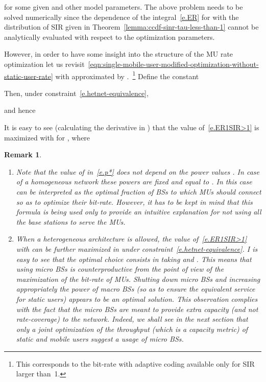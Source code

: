 \documentclass[10pt,journal]{IEEEtran}
\newtheorem{remark}{Remark}
\begin{document}
for some given   and other model parameters.
The above problem needs to be solved numerically since the 
dependence of the integral~\eqref{e.ER} for  with the 
distribution of SIR given in Theorem~\ref{lemma:ccdf-sinr-tau-less-than-1} cannot be
analytically evaluated with respect to the optimization
parameters. 

However, in order to have some insight into the structure of the MU rate
optimization let us
revisit~\eqref{eqn:single-mobile-user-modified-optimization-without-static-user-rate}
with  approximated by
.~\footnote{This
  corresponds to the bit-rate with adaptive coding
  available only for SIR larger than~1.} 
Define the constant

Then, under constraint~\eqref{e.hetnet-equivalence}, 

and hence

It is easy to see (calculating the derivative in ) that the value of~\eqref{e.ER1SIR>1} is maximized with 
for , where


\begin{remark}\label{rem.MU-rate-opt}
\begin{enumerate}
\item Note that the value of  in~\eqref{e.p*} does not depend on
  the power values . In case of a homogeneous
  network these powers are fixed and equal to
  . In this case  can be interpreted as
  the optimal  fraction of BSs to which MUs should connect so as to
optimize their bit-rate. However, it has to be kept in mind that this formula is being used only to 
provide an intuitive explanation for not using all the base stations to 
serve the MUs. 
\item When a heterogeneous architecture is allowed,  the value
  of~\eqref{e.ER1SIR>1} with  can be further maximized in
   under constraint~\eqref{e.hetnet-equivalence}. I is easy to see that the optimal choice consists in
  taking  and . 
This means that using micro BSs is counterproductive from the point of
view of the maximization of the  bit-rate of MUs. Shutting down micro
BSs  and increasing appropriately the power of macro BSs (so as to
ensure the equivalent service for static users) appears to be an
optimal solution. This observation complies with the fact that 
the micro BSs are meant to provide extra capacity (and not rate-coverage)
to the network. Indeed, we shall see in the next section that 
only a joint  optimization of the throughput (which is a capacity metric) of static and mobile users
suggest a usage of micro BSs.
\end{enumerate}
\end{remark}
\end{document}
